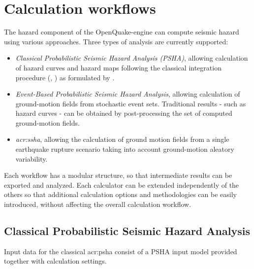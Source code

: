 \section{Calculation workflows}
The hazard component of the OpenQuake-engine can compute seismic hazard 
using various approaches.
%
Three types of analysis are currently supported:
\begin{itemize}
\item \textit{Classical Probabilistic Seismic Hazard Analysis (PSHA)}, 
allowing calculation of hazard curves and hazard maps following the 
classical integration procedure 
(\cite{cornell1968}, \citet{mcguire1976}) as formulated by \cite{field2003}.
%
\item \textit{Event-Based Probabilistic Seismic Hazard Analysis}, 
    allowing calculation of ground-motion fields from 
    stochastic event sets. Traditional results - 
    such as hazard curves - can be obtained by post-processing the 
    set of computed ground-motion fields.
\item \textit{\gls{acr:ssha}}, allowing the calculation of 
    ground motion fields from a single earthquake rupture scenario 
    taking into account ground-motion aleatory variability.
\end{itemize}
%
Each workflow has a modular structure, so that intermediate results 
can be exported and analyzed. Each calculator can be extended independently of the others so that additional calculation options and methodologies can be easily 
introduced, without affecting the overall calculation workflow.
%
\subsection{Classical Probabilistic Seismic Hazard Analysis}
\label{section:classicalPSHA}
%
Input data for the classical \gls{acr:psha} consist of a PSHA input model
provided together with calculation settings.


